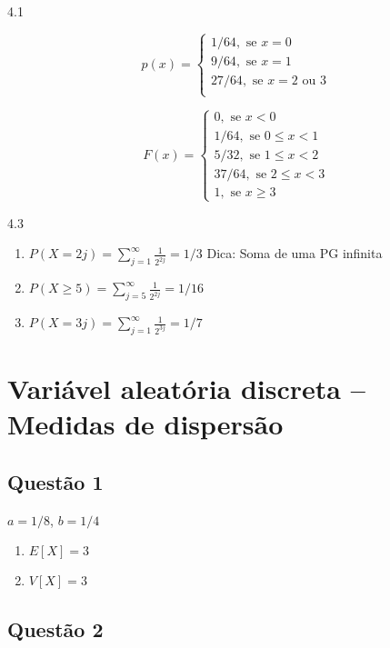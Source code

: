 \documentclass[
]{article}
\begin{document}
4.1

\[p(x) = \begin{cases}
1/64, \text{ se } x = 0\\
9/64, \text{ se } x = 1\\
27/64, \text{ se } x = 2 \text{ ou } 3\\
\end{cases}\]

\[F(x) = \begin{cases}
0, \text{ se } x < 0\\
1/64, \text{ se } 0 \leq x < 1\\
5/32, \text{ se } 1 \leq x < 2\\
37/64, \text{ se } 2\leq x < 3 \\
1, \text{ se } x\geq 3
\end{cases}\]

4.3

\begin{enumerate}
\def\labelenumi{\alph{enumi})}
\item
  \(P(X=2j)=\sum_{j=1}^\infty \frac{1}{2^{2j}}=1/3\) Dica: Soma de uma
  PG infinita
\item
  \(P(X\geq 5) = \sum_{j=5}^\infty \frac{1}{2^{2j}}=1/16\)
\item
  \(P(X=3j)=\sum_{j=1}^\infty \frac{1}{2^{3j}}=1/7\)
\end{enumerate}

\hypertarget{variuxe1vel-aleatuxf3ria-discreta-medidas-de-dispersuxe3o}{%
\section{Variável aleatória discreta -- Medidas de
dispersão}\label{variuxe1vel-aleatuxf3ria-discreta-medidas-de-dispersuxe3o}}

\hypertarget{questuxe3o-1-1}{%
\subsection{Questão 1}\label{questuxe3o-1-1}}

\(a=1/8\), \(b=1/4\)

\begin{enumerate}
\def\labelenumi{\alph{enumi})}
\item
  \(E[X]=3\)
\item
  \(V[X]=3\)
\end{enumerate}

\hypertarget{questuxe3o-2-1}{%
\subsection{Questão 2}\label{questuxe3o-2-1}}
\end{document}
